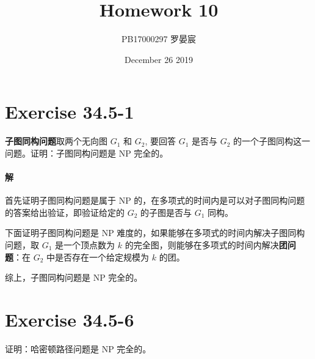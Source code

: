 \documentclass{article}
\title{Homework 10}
\author{PB17000297 罗晏宸}
\date{December 26 2019}
\begin{document}
\maketitle

\section{Exercise 34.5-1}
\textbf{子图同构问题}取两个无向图 $G_1$ 和 $G_2$, 要回答 $G_1$ 是否与 $G_2$ 的一个子图同构这一问题。证明：子图同构问题是 NP 完全的。

\paragraph{解}
首先证明子图同构问题是属于 NP 的，在多项式的时间内是可以对子图同构问题的答案给出验证，即验证给定的 $G_2$ 的子图是否与 $G_1$ 同构。\par
下面证明子图同构问题是 NP 难度的，如果能够在多项式的时间内解决子图同构问题，取 $G_1$ 是一个顶点数为 $k$ 的完全图，则能够在多项式的时间内解决\textbf{团问题}：在 $G_2$ 中是否存在一个给定规模为 $k$ 的团。\par
综上，子图同构问题是 NP 完全的。

\section{Exercise 34.5-6}
证明：哈密顿路径问题是 NP 完全的。
\end{document}

